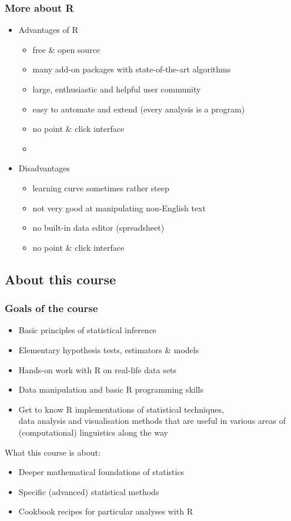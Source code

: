 \documentclass[t]{beamer} %
\begin{document}
\begin{frame}
  \frametitle{More about \textbf{R}}
  
  \begin{itemize}
  \item Advantages of R
    \begin{itemize}
    \item free \& open source
    \item many add-on packages with state-of-the-art algorithms
    \item large, enthusiastic and helpful user community
    \item easy to automate and extend (every analysis is a program)
    \item no point \& click interface
    \item[]
    \end{itemize}
  \item<2-> Disadvantages
    \begin{itemize}
    \item learning curve sometimes rather steep
    \item not very good at manipulating non-English text
    \item no built-in data editor (spreadsheet)
    \item no point \& click interface
    \end{itemize}
  \end{itemize}
\end{frame}

\subsection{About this course}

\begin{frame}
  \frametitle{Goals of the course}

  \begin{itemize}
  \item Basic principles of statistical inference
  \item Elementary hypothesis tests, estimators \& models
  \item Hands-on work with R on real-life data sets
  \item Data manipulation and basic R programming skills
  \item Get to know R implementations of statistical techniques,\\
    data analysis and visualisation methods that are useful in various areas
    of (computational) linguistics along the way
  \end{itemize}

  \pause\gap
  What this course is \emph{} about:
  \begin{itemize}
  \item Deeper mathematical foundations of statistics
  \item Specific (advanced) statistical methods
  \item Cookbook recipes for particular analyses with R
  \end{itemize}

\end{frame}
\end{document}
